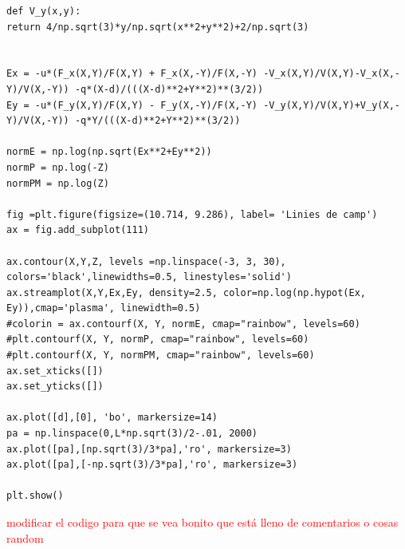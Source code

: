 \documentclass[a4paper,10.5pt]{report}
\begin{document}
\begin{appendices}
\begin{lstlisting}
def V_y(x,y):
return 4/np.sqrt(3)*y/np.sqrt(x**2+y**2)+2/np.sqrt(3)


Ex = -u*(F_x(X,Y)/F(X,Y) + F_x(X,-Y)/F(X,-Y) -V_x(X,Y)/V(X,Y)-V_x(X,-Y)/V(X,-Y)) -q*(X-d)/(((X-d)**2+Y**2)**(3/2))
Ey = -u*(F_y(X,Y)/F(X,Y) - F_y(X,-Y)/F(X,-Y) -V_y(X,Y)/V(X,Y)+V_y(X,-Y)/V(X,-Y)) -q*Y/(((X-d)**2+Y**2)**(3/2))

normE = np.log(np.sqrt(Ex**2+Ey**2))
normP = np.log(-Z)
normPM = np.log(Z)

fig =plt.figure(figsize=(10.714, 9.286), label= 'Linies de camp') 
ax = fig.add_subplot(111)

ax.contour(X,Y,Z, levels =np.linspace(-3, 3, 30), colors='black',linewidths=0.5, linestyles='solid')
ax.streamplot(X,Y,Ex,Ey, density=2.5, color=np.log(np.hypot(Ex, Ey)),cmap='plasma', linewidth=0.5)
#colorin = ax.contourf(X, Y, normE, cmap="rainbow", levels=60)
#plt.contourf(X, Y, normP, cmap="rainbow", levels=60)
#plt.contourf(X, Y, normPM, cmap="rainbow", levels=60)
ax.set_xticks([])
ax.set_yticks([])

ax.plot([d],[0], 'bo', markersize=14)
pa = np.linspace(0,L*np.sqrt(3)/2-.01, 2000)
ax.plot([pa],[np.sqrt(3)/3*pa],'ro', markersize=3)
ax.plot([pa],[-np.sqrt(3)/3*pa],'ro', markersize=3)

plt.show()
\end{lstlisting}

\textcolor{red}{modificar el codigo para que se vea bonito que está lleno de comentarios o cosas random}

\end{appendices}
\end{document}

